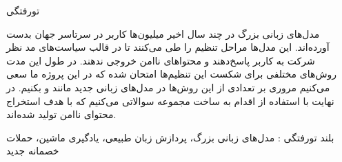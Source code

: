 


‌تورفتگی

مدل‌های زبانی بزرگ در چند سال اخیر میلیون‌ها کاربر در سرتاسر جهان بدست آورده‌اند. این مدل‌ها مراحل تنظیم را طی می‌کنند تا در قالب سیاست‌های مد نظر شرکت به کاربر پاسخ‌دهند و محتواهای ناامن خروجی ندهند. در طول این مدت روش‌های مختلفی برای شکست این تنظیم‌ها امتحان شده که در این پروژه ما سعی می‌کنیم مروری بر تعدادی از این روش‌ها در مدل‌های زبانی جدید مانند  و  بکنیم.
در نهایت با استفاده از  اقدام به ساخت مجموعه سوالاتی می‌کنیم که با هدف استخراج محتوای ناامن تولید شده‌اند.

‌بلند
‌تورفتگی : 
مدل‌های زبانی بزرگ، پردازش زبان طبیعی، یادگیری ماشین، حملات خصمانه
‌جدید
